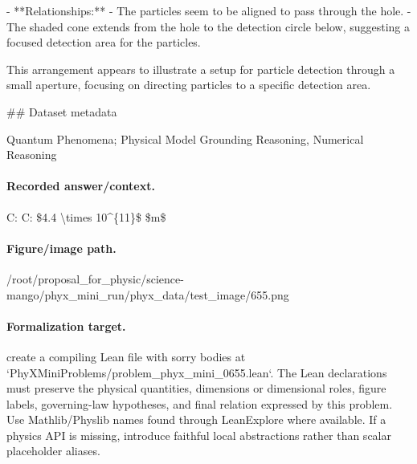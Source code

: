 - **Relationships:**
  - The particles seem to be aligned to pass through the hole.
  - The shaded cone extends from the hole to the detection circle below, suggesting a focused detection area for the particles.

This arrangement appears to illustrate a setup for particle detection through a small aperture, focusing on directing particles to a specific detection area.

\#\# Dataset metadata

Quantum Phenomena; Physical Model Grounding Reasoning, Numerical Reasoning

\paragraph{Recorded answer/context.}
C: C: \$4.4 \textbackslash{}times 10\textasciicircum{}\{11\}\$ \$m\$

\paragraph{Figure/image path.}
/root/proposal\_for\_physic/science-mango/phyx\_mini\_run/phyx\_data/test\_image/655.png

\paragraph{Formalization target.}
create a compiling Lean file with sorry bodies at `PhyXMiniProblems/problem\_phyx\_mini\_0655.lean`. The Lean declarations must preserve the physical quantities, dimensions or dimensional roles, figure labels, governing-law hypotheses, and final relation expressed by this problem.
Use Mathlib/Physlib names found through LeanExplore where available. If a physics API is missing, introduce faithful local abstractions rather than scalar placeholder aliases.

